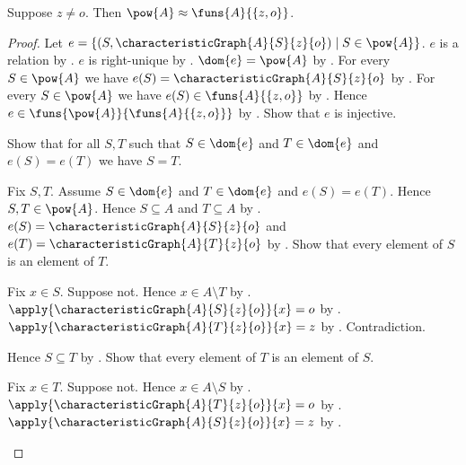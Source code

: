 \begin{theorem}\label{powerset_equinum_binary_function_space}
    Suppose $z\neq o$.
    Then $\pow{A}\approx\funs{A}{\{z,o\}}$.
\end{theorem}
\begin{proof}
    Let $e=\{(S,\characteristicGraph{A}{S}{z}{o})\mid S\in\pow{A}\}$.
    $e$ is a relation by .
    $e$ is right-unique by .
    $\dom{e}=\pow{A}$ by .
    For every $S\in\pow{A}$ we have
        $e(S)=\characteristicGraph{A}{S}{z}{o}$
        by .
    For every $S\in\pow{A}$ we have
        $e(S)\in\funs{A}{\{z,o\}}$
        by .
    Hence $e\in\funs{\pow{A}}{\funs{A}{\{z,o\}}}$
        by .
    Show that $e$ is injective.
    \begin{subproof}
        Show that for all $S,T$ such that $S\in\dom{e}$ and
            $T\in\dom{e}$ and $e(S)=e(T)$ we have $S=T$.
        \begin{subproof}
            Fix $S,T$.
            Assume $S\in\dom{e}$ and $T\in\dom{e}$ and $e(S)=e(T)$.
            Hence $S,T\in\pow{A}$.
            Hence $S\subseteq A$ and $T\subseteq A$
                by .
            $e(S)=\characteristicGraph{A}{S}{z}{o}$ and
                $e(T)=\characteristicGraph{A}{T}{z}{o}$
                by .
            Show that every element of $S$ is an element of $T$.
            \begin{subproof}
                Fix $x\in S$.
                Suppose not.
                Hence $x\in A\setminus T$ by .
                $\apply{\characteristicGraph{A}{S}{z}{o}}{x}=o$
                    by .
                $\apply{\characteristicGraph{A}{T}{z}{o}}{x}=z$
                    by .
                Contradiction.
            \end{subproof}
            Hence $S\subseteq T$ by .
            Show that every element of $T$ is an element of $S$.
            \begin{subproof}
                Fix $x\in T$.
                Suppose not.
                Hence $x\in A\setminus S$ by .
                $\apply{\characteristicGraph{A}{T}{z}{o}}{x}=o$
                    by .
                $\apply{\characteristicGraph{A}{S}{z}{o}}{x}=z$
                    by .

\end{subproof}
\end{subproof}
\end{subproof}
\end{proof}
